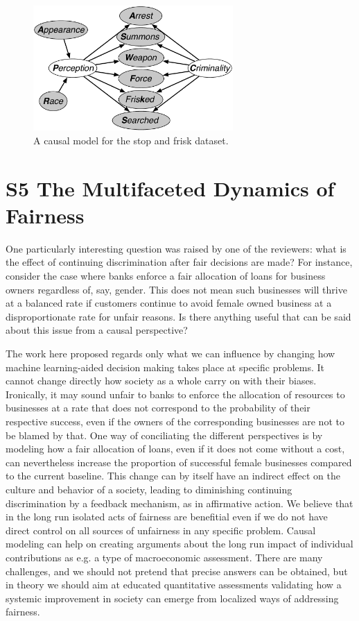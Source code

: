\begin{figure}[th]
\begin{center}
\centerline{\includegraphics[width=3in]{stop_and_frisk_model3.pdf}}
\caption{A causal model for the stop and frisk dataset.\label{figure.stop_and_frisk}}
\end{center}
\end{figure}

\section*{S5 The Multifaceted Dynamics of Fairness}
\label{sec:dynamics}

One particularly interesting question was raised by one of the
reviewers: what is the effect of continuing discrimination after fair
decisions are made?  For instance, consider the case where banks
enforce a fair allocation of loans for business owners regardless of,
say, gender. This does not mean such businesses will thrive at a
balanced rate if customers continue to avoid female owned business at
a disproportionate rate for unfair reasons. Is there anything useful
that can be said about this issue from a causal perspective?

The work here proposed regards only what we can influence by changing
how machine learning-aided decision making takes place at specific
problems. It cannot change directly how society as a whole carry on
with their biases. Ironically, it may sound unfair to banks to enforce
the allocation of resources to businesses at a rate that does not
correspond to the probability of their respective success, even if the
owners of the corresponding businesses are not to be blamed by
that. One way of conciliating the different perspectives is by
modeling how a fair allocation of loans, even if it does not come
without a cost, can nevertheless increase the proportion of successful
female businesses compared to the current baseline. This change can by
itself have an indirect effect on the culture and behavior of a
society, leading to diminishing continuing discrimination by a
feedback mechanism, as in affirmative action. We believe that in the
long run isolated acts of fairness are benefitial even if we do not
have direct control on all sources of unfairness in any specific
problem.  Causal modeling can help on creating arguments about the
long run impact of individual contributions as e.g. a type of
macroeconomic assessment. There are many challenges, and we should not
pretend that precise answers can be obtained, but in theory we should
aim at educated quantitative assessments validating how a systemic
improvement in society can emerge from localized ways of addressing
fairness.


